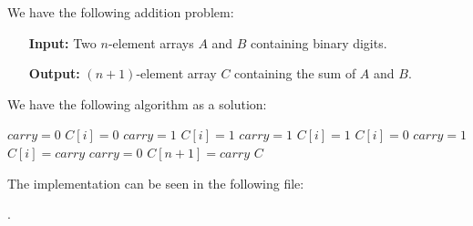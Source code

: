 
We have the following addition problem:

\begin{itemize}
    \item[\textbf{Input:}] Two $n$-element arrays $A$ and $B$ containing binary digits.
    \item[\textbf{Output:}] $(n+1)$-element array $C$ containing the sum of $A$ and $B$.
\end{itemize}

We have the following algorithm as a solution:

\begin{algorithmic}[1]
    \STATE $\mathit{carry} = 0$
                \STATE $C[i] = 0$
                \STATE $\mathit{carry} = 1$
            \ELSE
                \STATE $C[i] = 1$
                \STATE $\mathit{carry} = 1$
            \ENDIF
                \STATE $C[i] = 1$
            \ELSE
                \STATE $C[i] = 0$
                \STATE $\mathit{carry} = 1$
            \ENDIF
        \ELSE
            \STATE $C[i] = \mathit{carry}$
            \STATE $\mathit{carry} = 0$
        \ENDIF
    \ENDFOR
    \STATE $C[n + 1] = \mathit{carry}$
    \RETURN $C$
\end{algorithmic}

The implementation can be seen in the following file:

.
